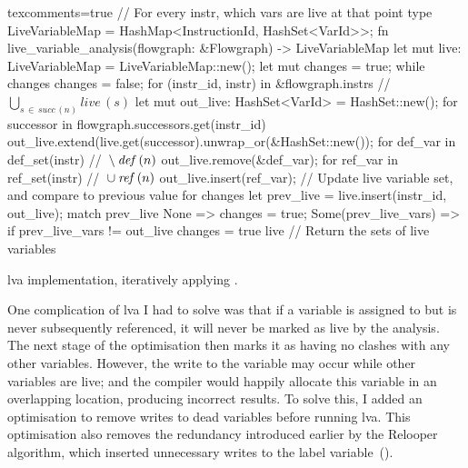 \documentclass[00-main.tex]{subfiles}
\begin{document}
\begin{listing}[!t]
  \begin{RustListing*}{texcomments=true}
    // For every instr, which vars are live at that point
    type LiveVariableMap = HashMap<InstructionId, HashSet<VarId>>;
    fn live_variable_analysis(flowgraph: &Flowgraph) -> LiveVariableMap {
        let mut live: LiveVariableMap = LiveVariableMap::new();
        let mut changes = true;
        while changes {
            changes = false;
            for (instr_id, instr) in &flowgraph.instrs {
                // $\bigcup_{s \,\in\, \mathit{succ}\,(n)} \mathit{live}\,(s)$
                let mut out_live: HashSet<VarId> = HashSet::new();
                for successor in flowgraph.successors.get(instr_id) {
                    out_live.extend(live.get(successor).unwrap_or(&HashSet::new());
                }
                for def_var in def_set(instr) { // ${} \setminus \lvadef\,(n)$
                    out_live.remove(&def_var);
                }
                for ref_var in ref_set(instr) { // ${} \cup \lvaref\,(n)$
                    out_live.insert(ref_var);
                }
                // Update live variable set, and compare to previous value for changes
                let prev_live = live.insert(instr_id, out_live);
                match prev_live {
                    None => {
                        changes = true;
                    }
                    Some(prev_live_vars) => {
                        if prev_live_vars != out_live {
                            changes = true
                        }
                    }
                }
            }
        }
        live // Return the sets of live variables
    }
  \end{RustListing*}
  \caption{\Acrlong{lva} implementation, iteratively applying .}%
  \label{lst:lva implementation}
\end{listing}

One complication of \gls{lva} I had to solve was that if a variable is assigned to but is never subsequently referenced, it will never be marked as live by the analysis.
The next stage of the optimisation then marks it as having no clashes with any other variables.
However, the write to the variable may occur while other variables are live; and the compiler would happily allocate this variable in an overlapping location, producing incorrect results.
To solve this, I added an optimisation to remove writes to dead variables before running \gls{lva}.
This optimisation also removes the redundancy introduced earlier by the Relooper algorithm, which inserted unnecessary writes to the label variable~().
\end{document}
